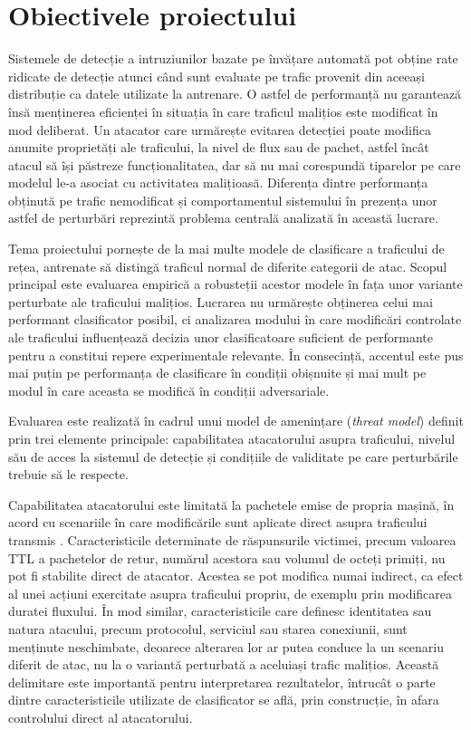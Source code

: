 \chapter{Obiectivele proiectului}\label{ch:obiective}

\pagestyle{fancy}

Sistemele de detecție a intruziunilor bazate pe învățare automată pot obține rate ridicate de detecție atunci când sunt evaluate pe trafic provenit din aceeași distribuție ca datele utilizate la antrenare. O astfel de performanță nu garantează însă menținerea eficienței în situația în care traficul malițios este modificat în mod deliberat. Un atacator care urmărește evitarea detecției poate modifica anumite proprietăți ale traficului, la nivel de flux sau de pachet, astfel încât atacul să își păstreze funcționalitatea, dar să nu mai corespundă tiparelor pe care modelul le-a asociat cu activitatea malițioasă. Diferența dintre performanța obținută pe trafic nemodificat și comportamentul sistemului în prezența unor astfel de perturbări reprezintă problema centrală analizată în această lucrare.

Tema proiectului pornește de la mai multe modele de clasificare a traficului de rețea, antrenate să distingă traficul normal de diferite categorii de atac. Scopul principal este evaluarea empirică a robusteții acestor modele în fața unor variante perturbate ale traficului malițios. Lucrarea nu urmărește obținerea celui mai performant clasificator posibil, ci analizarea modului în care modificări controlate ale traficului influențează decizia unor clasificatoare suficient de performante pentru a constitui repere experimentale relevante. În consecință, accentul este pus mai puțin pe performanța de clasificare în condiții obișnuite și mai mult pe modul în care aceasta se modifică în condiții adversariale.

Evaluarea este realizată în cadrul unui model de amenințare (\textit{threat model}) definit prin trei elemente principale: capabilitatea atacatorului asupra traficului, nivelul său de acces la sistemul de detecție și condițiile de validitate pe care perturbările trebuie să le respecte.

Capabilitatea atacatorului este limitată la pachetele emise de propria mașină, în acord cu scenariile în care modificările sunt aplicate direct asupra traficului transmis \cite{tan2022sneaking}. Caracteristicile determinate de răspunsurile victimei, precum valoarea TTL a pachetelor de retur, numărul acestora sau volumul de octeți primiți, nu pot fi stabilite direct de atacator. Acestea se pot modifica numai indirect, ca efect al unei acțiuni exercitate asupra traficului propriu, de exemplu prin modificarea duratei fluxului. În mod similar, caracteristicile care definesc identitatea sau natura atacului, precum protocolul, serviciul sau starea conexiunii, sunt menținute neschimbate, deoarece alterarea lor ar putea conduce la un scenariu diferit de atac, nu la o variantă perturbată a aceluiași trafic malițios. Această delimitare este importantă pentru interpretarea rezultatelor, întrucât o parte dintre caracteristicile utilizate de clasificator se află, prin construcție, în afara controlului direct al atacatorului.

